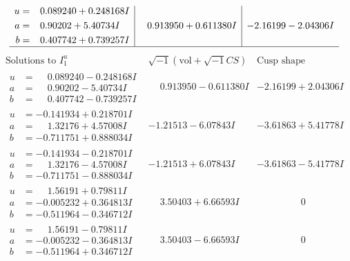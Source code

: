 \documentclass[1p]{elsarticle_modified}
\theoremstyle{definition}
\newcommand{\I}{\sqrt{-1}}
\begin{document}
$$\begin{array}{c|c|c}
\begin{aligned}
u &= \phantom{-}0.089240 + 0.248168 I \\
a &= \phantom{-}0.90202 + 5.40734 I \\
b &= \phantom{-}0.407742 + 0.739257 I\end{aligned}
 & \phantom{-}0.913950 + 0.611380 I & -2.16199 - 2.04306 I\\
 \hline 
 \end{array}$$\newpage$$\begin{array}{c|c|c}  
\text{Solutions to }I^u_{1}& \I (\text{vol} + \sqrt{-1}CS) & \text{Cusp shape}\\
 \hline 
\begin{aligned}
u &= \phantom{-}0.089240 - 0.248168 I \\
a &= \phantom{-}0.90202 - 5.40734 I \\
b &= \phantom{-}0.407742 - 0.739257 I\end{aligned}
 & \phantom{-}0.913950 - 0.611380 I & -2.16199 + 2.04306 I \\ \hline\begin{aligned}
u &= -0.141934 + 0.218701 I \\
a &= \phantom{-}1.32176 + 4.57008 I \\
b &= -0.711751 + 0.888034 I\end{aligned}
 & -1.21513 - 6.07843 I & -3.61863 + 5.41778 I \\ \hline\begin{aligned}
u &= -0.141934 - 0.218701 I \\
a &= \phantom{-}1.32176 - 4.57008 I \\
b &= -0.711751 - 0.888034 I\end{aligned}
 & -1.21513 + 6.07843 I & -3.61863 - 5.41778 I \\ \hline\begin{aligned}
u &= \phantom{-}1.56191 + 0.79811 I \\
a &= -0.005232 + 0.364813 I \\
b &= -0.511964 - 0.346712 I\end{aligned}
 & \phantom{-}3.50403 + 6.66593 I & \phantom{-0.000000 } 0 \\ \hline\begin{aligned}
u &= \phantom{-}1.56191 - 0.79811 I \\
a &= -0.005232 - 0.364813 I \\
b &= -0.511964 + 0.346712 I\end{aligned}
 & \phantom{-}3.50403 - 6.66593 I & \phantom{-0.000000 } 0 \\ \hline\begin{aligned}

\end{aligned}
\end{array}$$
\end{document}

